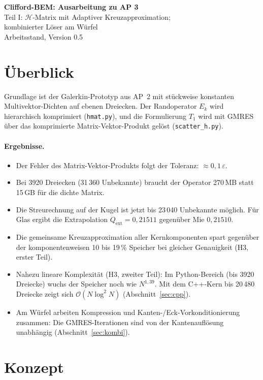 \documentclass[11pt, a4paper]{article}
\begin{document}
\begin{center}
  \sffamily
  {\Large\textbf{Clifford-BEM: Ausarbeitung zu AP 3}}\\[0.3cm]
  {\large Teil I: $\mathcal{H}$-Matrix mit Adaptiver Kreuzapproximation;\\ kombinierter Löser am Würfel}\\[0.3cm]
  {\small Arbeitsstand, Version 0.5}
\end{center}

\section*{Überblick}
Grundlage ist der Galerkin-Prototyp aus AP~2 mit stückweise konstanten
Multivektor-Dichten auf ebenen Dreiecken. Der Randoperator $E_k$ wird hierarchisch
komprimiert (\texttt{hmat.py}), und die Formulierung $T_1$ wird mit GMRES über das
komprimierte Matrix-Vektor-Produkt gelöst (\texttt{scatter\_h.py}).

\paragraph{Ergebnisse.}
\begin{itemize}[leftmargin=*]
  \item Der Fehler des Matrix-Vektor-Produkts folgt der Toleranz: $\approx0{,}1\,\varepsilon$.
  \item Bei 3920 Dreiecken (31\,360 Unbekannte) braucht der Operator 270\,MB statt 15\,GB
    für die dichte Matrix.
  \item Die Streurechnung auf der Kugel ist jetzt bis 23\,040 Unbekannte möglich. Für Glas
    ergibt die Extrapolation $Q_{\mathrm{ext}}=0{,}21511$ gegenüber Mie $0{,}21510$.
  \item Die gemeinsame Kreuzapproximation aller Kernkomponenten spart gegenüber der
    komponentenweisen 10 bis 19\,\% Speicher bei gleicher Genauigkeit (H3, erster Teil).
  \item Nahezu lineare Komplexität (H3, zweiter Teil): Im Python-Bereich (bis 3920
    Dreiecke) wuchs der Speicher noch wie $N^{1{,}39}$. Mit dem C++-Kern bis 20\,480 Dreiecke
    zeigt sich $\mathcal{O}(N\log^2N)$ (Abschnitt~\ref{sec:cpp}).
  \item Am Würfel arbeiten Kompression und Kanten-/Eck-Vorkonditionierung zusammen: Die
    GMRES-Iterationen sind von der Kantenauflösung unabhängig (Abschnitt~\ref{sec:kombi}).
\end{itemize}

\section{Konzept}
\end{document}
